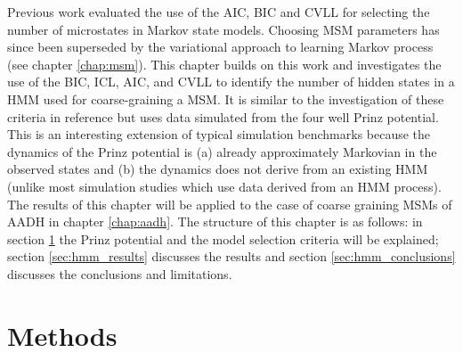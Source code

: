 Previous work\cite{mcgibbonStatisticalModelSelection2014a} evaluated the use of the AIC, BIC and CVLL for selecting the number of microstates in Markov state models. Choosing MSM parameters has since been superseded by the variational approach to learning Markov process (see chapter \ref{chap:msm}). This chapter builds on this work and investigates the use of the BIC, ICL, AIC, and CVLL to identify the number of hidden states in a HMM used for coarse-graining a MSM. It is similar to the investigation of these criteria in reference \cite{celeuxSelectingHiddenMarkov2008} but uses data simulated from the four well Prinz potential. This is an interesting extension of typical simulation benchmarks because the dynamics of the Prinz potential is (a) already approximately Markovian in the observed states and (b) the dynamics does not derive from an existing HMM (unlike most simulation studies which use data derived from an HMM process). The results of this chapter will be applied to the case of coarse graining MSMs of AADH in chapter \ref{chap:aadh}.  The structure of this chapter is as follows: in section \ref{sec:hmm_methods} the Prinz potential and the model selection criteria will be explained; section \ref{sec:hmm_results} discusses the results and section \ref{sec:hmm_conclusions} discusses the conclusions and limitations.

\section{Methods} \label{sec:hmm_methods}
